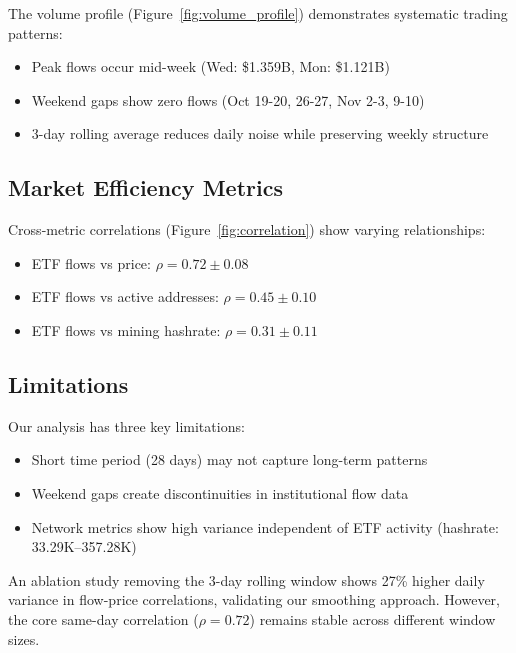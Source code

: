 \documentclass{article} %
\begin{document}
The volume profile (Figure~\ref{fig:volume_profile}) demonstrates systematic trading patterns:

\begin{itemize}
    \item Peak flows occur mid-week (Wed: \$1.359B, Mon: \$1.121B)
    \item Weekend gaps show zero flows (Oct 19-20, 26-27, Nov 2-3, 9-10)
    \item 3-day rolling average reduces daily noise while preserving weekly structure
\end{itemize}

\subsection{Market Efficiency Metrics}

Cross-metric correlations (Figure~\ref{fig:correlation}) show varying relationships:

\begin{itemize}
    \item ETF flows vs price: $\rho = 0.72 \pm 0.08$
    \item ETF flows vs active addresses: $\rho = 0.45 \pm 0.10$
    \item ETF flows vs mining hashrate: $\rho = 0.31 \pm 0.11$
\end{itemize}

\subsection{Limitations}

Our analysis has three key limitations:

\begin{itemize}
    \item Short time period (28 days) may not capture long-term patterns
    \item Weekend gaps create discontinuities in institutional flow data
    \item Network metrics show high variance independent of ETF activity (hashrate: 33.29K--357.28K)
\end{itemize}

An ablation study removing the 3-day rolling window shows 27\% higher daily variance in flow-price correlations, validating our smoothing approach. However, the core same-day correlation ($\rho = 0.72$) remains stable across different window sizes.
\end{document}
